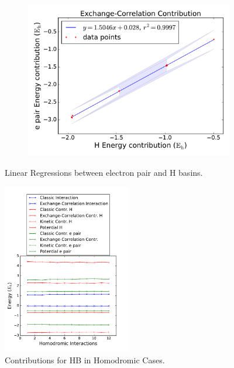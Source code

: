 \begin{figure}[hb]
\begin{subfigure}[b]{0.32\textwidth}
     \end{subfigure}
     \hfill
     \begin{subfigure}[b]{0.32\textwidth}
         \centering
         \includegraphics[width=\textwidth]{4/plots/promelf/rl_xc1_xc2}
     \end{subfigure}
        \caption{Linear Regressions between electron pair and H basins.}
        \label{rlineales}
\end{figure}

\pagebreak

\begin{figure}
    \centering
    \includegraphics[width=0.5\textwidth]{4/plots/promelf/homodromic1.pdf}
    \caption{Contributions for HB in Homodromic Cases.}
    \label{homodromic}
\end{figure}

